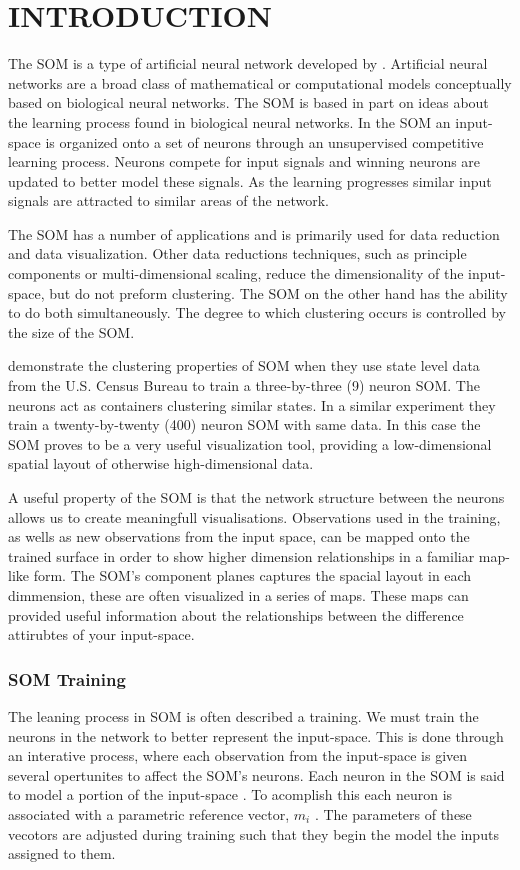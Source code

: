 
\chapter{INTRODUCTION}
The SOM is a type of artificial neural network developed by \cite{Kohonen2000}. 
Artificial neural networks are a broad class of mathematical or computational
models conceptually based on biological neural networks.  The SOM is based in part
on ideas about the learning process found in biological neural networks.  In
the SOM an input-space is organized onto a set of neurons through an unsupervised
competitive learning process.  Neurons compete for input signals and winning
neurons are updated to better model these signals. As the learning progresses
similar input signals are attracted to similar areas of the network.

The SOM has a number of applications and is primarily used for data reduction
and data visualization.  Other data reductions techniques, such as principle
components or multi-dimensional scaling, reduce the dimensionality of 
the input-space, but do not preform clustering.  The SOM on the other hand has
the ability to do both simultaneously.  The degree to which clustering occurs
is controlled by the size of the SOM.

\cite{skupin08} demonstrate the clustering properties of SOM when they use
state level data from the U.S. Census Bureau to train a three-by-three (9)
neuron SOM.  The neurons act as containers clustering similar states.  In a
similar experiment they train a twenty-by-twenty (400) neuron SOM with same
data.  In this case the SOM proves to be a very useful visualization tool,
providing a low-dimensional spatial layout of otherwise high-dimensional data.

A useful property of the SOM is that the network structure between the neurons
allows us to create meaningfull visualisations.  Observations used in the
training, as wells as new observations from the input space,  can be mapped
onto the trained surface in order to show higher dimension relationships in a
familiar map-like form. The SOM's component planes captures the spacial layout
in each dimmension, these are often visualized in a series of maps.  These
maps can provided useful information about the relationships between the
difference attirubtes of your input-space.

\subsection{SOM Training}
The leaning process in SOM is often described a training.  We must train the
neurons in the network to better represent the input-space.  This is done
through an interative process, where each observation from the input-space is
given several opertunites to affect the SOM's neurons.  Each neuron in the SOM
is said to model a portion of the input-space \cite{Kohonen2000}. To acomplish
this each neuron is associated with a parametric reference vector, \(m_i\)
\cite{Kohonen2000}.  The parameters of these vecotors are adjusted during
training such that they begin the model the inputs assigned to them.





